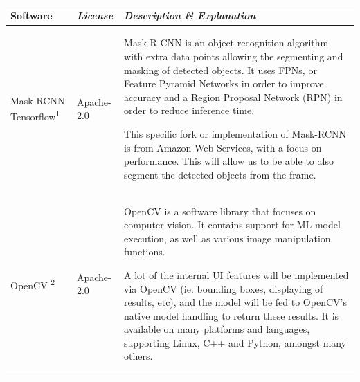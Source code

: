 \documentclass[conference]{IEEEtran}
\begin{document}
\begin{table}[htbp!]\normalsize
\begin{center}
\begin{tabular}{|p{1.5cm}|p{1.5cm}|p{4.7cm}|}
\hline
\textbf{Software} & \textbf{\textit{License}}& \textbf{\textit{Description \& Explanation}}\\
\hline
Mask-RCNN Tensorflow\textsuperscript{1} & Apache-2.0 &
Mask R-CNN is an object recognition algorithm with extra data points allowing the segmenting and masking of detected objects. It uses FPNs, or Feature Pyramid Networks in order to improve accuracy and a Region Proposal Network (RPN) in order to reduce inference time. \newline

This specific fork or implementation of Mask-RCNN is from Amazon Web Services, with a focus on performance. This will allow us to be able to also segment the detected objects from the frame.
\\ \hline
OpenCV \textsuperscript{2} & Apache-2.0 &
OpenCV is a software library that focuses on computer vision. It contains support for ML model execution, as well as various image manipulation functions.\newline

A lot of the internal UI features will be implemented via OpenCV (ie. bounding boxes, displaying of results, etc), and the model will be fed to OpenCV's native model handling to return these results. It is available on many platforms and languages, supporting Linux, C++ and Python, amongst many others.
\\ \hline
\end{tabular}
\label{tab1}
\end{center}
\end{table}
\end{document}
